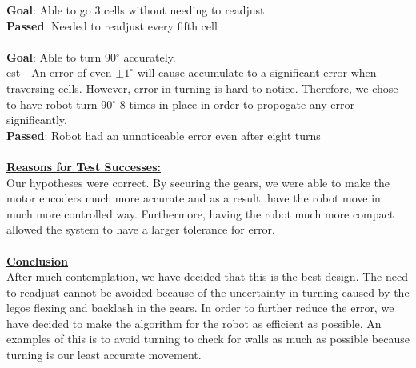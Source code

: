 \documentclass[11pt]{article}
\begin{document}
\textbf{Goal}: Able to go 3 cells without needing to readjust\\
\textbf{Passed}: Needed to readjust every fifth cell\\\\
\textbf{Goal}: Able to turn 90$^{\circ}$ accurately.\\
est - An error of even $ \pm 1^{\circ}$ will cause accumulate to a significant error when traversing cells. However, error in turning is hard to notice. Therefore, we chose to have robot turn 90$^{\circ}$ 8 times in place in order to propogate any error significantly. \\
\textbf{Passed}: Robot had an unnoticeable error even after eight turns\\\\
\textbf{\underline{Reasons for Test Successes:}}\\
Our hypotheses were correct. By securing the gears, we were able to make the motor encoders much more accurate and as a result, have the robot move in much more controlled way. Furthermore, having the robot much more compact allowed the system to have a larger tolerance for error.\\\\
\underline{\textbf{Conclusion}}\\
After much contemplation, we have decided that this is the best design. The need to readjust cannot be avoided because of the uncertainty in turning caused by the legos flexing and backlash in the gears. In order to further reduce the error, we have decided to make the algorithm for the robot as efficient as possible. An examples of this is to avoid turning to check for walls as much as possible because turning is our least accurate movement.


\newpage

\end{document}
